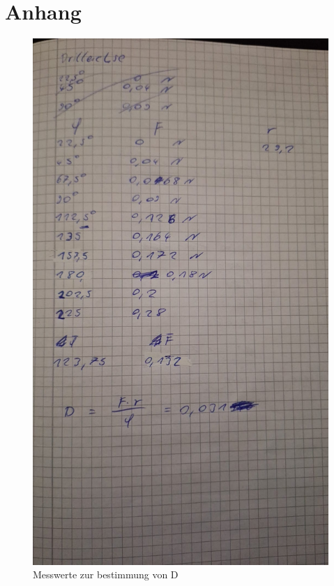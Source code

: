 \section{Anhang}
\label{sec:Anhang}
\begin{figure}[h]
    \centering
    \begin{minipage}{0.45\textwidth}
        \centering
        \includegraphics[width=\textwidth]{Bilder/messwerte1.jpg}
        \caption{Messwerte zur bestimmung von D}
    \end{minipage}

\end{figure}
